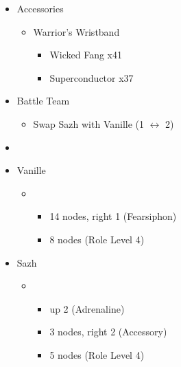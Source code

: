\begin{upgrade}
	\begin{itemize}
		\item Accessories
			\begin{itemize}
				\item Warrior's Wristband
					\begin{itemize}
						\item Wicked Fang x41
						\item Superconductor x37
					\end{itemize}
			\end{itemize}
	\end{itemize}	
\end{upgrade}
\vfill
\begin{menu}
	\begin{itemize}
		\paradigm
		\begin{itemize}
			\item Battle Team
				\begin{itemize}
					\item Swap Sazh with Vanille (1 $\leftrightarrow$ 2)
				\end{itemize}
			\item {}%
				{\paradigmline{\com}{(\com)}{\com}}%
				{\paradigmline{\com}{\com}{\com}}%
				{\paradigmline{\rav}{\rav}{\sen}}%
				{\paradigmline{\med}{\com}{\com}}%
				{\paradigmline[4]{(\sab)}{\rav}{(\rav)}}%
				{\paradigmline{\rav}{\rav}{\rav}}%
		\end{itemize}
		\crystarium
		\begin{itemize}
			\item Vanille
				\begin{itemize}
					\item \rav
						\begin{itemize}
							\item 14 nodes, right 1 (Fearsiphon)
							\item 8 nodes (Role Level 4)
						\end{itemize}
				\end{itemize}
			\item Sazh
				\begin{itemize}
					\item \com
						\begin{itemize}
							\item up 2 (Adrenaline)
							\item 3 nodes, right 2 (Accessory)
							\item 5 nodes (Role Level 4)

\end{itemize}
\end{itemize}
\end{itemize}
\end{itemize}
\end{menu}
